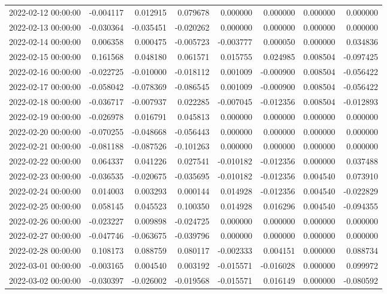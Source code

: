 \begin{tabular}{lrrrrrrr}
2022-02-12 00:00:00 & -0.004117 & 0.012915 & 0.079678 & 0.000000 & 0.000000 & 0.000000 & 0.000000 \\
2022-02-13 00:00:00 & -0.030364 & -0.035451 & -0.020262 & 0.000000 & 0.000000 & 0.000000 & 0.000000 \\
2022-02-14 00:00:00 & 0.006358 & 0.000475 & -0.005723 & -0.003777 & 0.000050 & 0.000000 & 0.034836 \\
2022-02-15 00:00:00 & 0.161568 & 0.048180 & 0.061571 & 0.015755 & 0.024985 & 0.008504 & -0.097425 \\
2022-02-16 00:00:00 & -0.022725 & -0.010000 & -0.018112 & 0.001009 & -0.000900 & 0.008504 & -0.056422 \\
2022-02-17 00:00:00 & -0.058042 & -0.078369 & -0.086545 & 0.001009 & -0.000900 & 0.008504 & -0.056422 \\
2022-02-18 00:00:00 & -0.036717 & -0.007937 & 0.022285 & -0.007045 & -0.012356 & 0.008504 & -0.012893 \\
2022-02-19 00:00:00 & -0.026978 & 0.016791 & 0.045813 & 0.000000 & 0.000000 & 0.000000 & 0.000000 \\
2022-02-20 00:00:00 & -0.070255 & -0.048668 & -0.056443 & 0.000000 & 0.000000 & 0.000000 & 0.000000 \\
2022-02-21 00:00:00 & -0.081188 & -0.087526 & -0.101263 & 0.000000 & 0.000000 & 0.000000 & 0.000000 \\
2022-02-22 00:00:00 & 0.064337 & 0.041226 & 0.027541 & -0.010182 & -0.012356 & 0.000000 & 0.037488 \\
2022-02-23 00:00:00 & -0.036535 & -0.020675 & -0.035695 & -0.010182 & -0.012356 & 0.004540 & 0.073910 \\
2022-02-24 00:00:00 & 0.014003 & 0.003293 & 0.000144 & 0.014928 & -0.012356 & 0.004540 & -0.022829 \\
2022-02-25 00:00:00 & 0.058145 & 0.045523 & 0.100350 & 0.014928 & 0.016296 & 0.004540 & -0.094355 \\
2022-02-26 00:00:00 & -0.023227 & 0.009898 & -0.024725 & 0.000000 & 0.000000 & 0.000000 & 0.000000 \\
2022-02-27 00:00:00 & -0.047746 & -0.063675 & -0.039796 & 0.000000 & 0.000000 & 0.000000 & 0.000000 \\
2022-02-28 00:00:00 & 0.108173 & 0.088759 & 0.080117 & -0.002333 & 0.004151 & 0.000000 & 0.088734 \\
2022-03-01 00:00:00 & -0.003165 & 0.004540 & 0.003192 & -0.015571 & -0.016028 & 0.000000 & 0.099972 \\
2022-03-02 00:00:00 & -0.030397 & -0.026002 & -0.019568 & -0.015571 & 0.016149 & 0.000000 & -0.080592 \\

\end{tabular}
